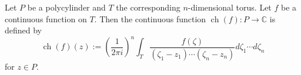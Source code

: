 Let $P$ be a polycylinder and $T$ the corresponding $n$-dimensional torus. Let $f$ be a continuous function on $T$. Then the continuous function $\operatorname{ch}(f): P \to \mathbb{C}$ is defined by
$$\operatorname{ch}(f)(z) := \left(\frac{1}{2\pi i}\right)^n \int_{T} \frac{f(\zeta)}{(\zeta_1 - z_1) \cdots (\zeta_n - z_n)} d\zeta_1 \cdots d\zeta_n$$
for $z \in P$.
